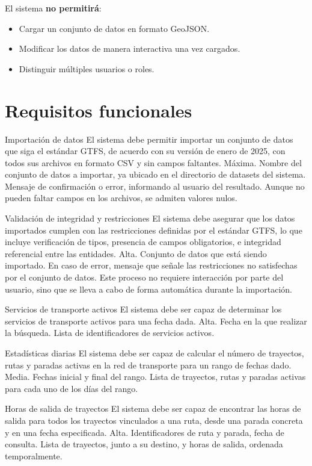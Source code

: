 El sistema \textbf{no permitirá}:
\begin{itemize}
    \item Cargar un conjunto de datos en formato GeoJSON.
    \item Modificar los datos de manera interactiva una vez cargados.
    \item Distinguir múltiples usuarios o roles.
\end{itemize}


\section{Requisitos funcionales}

\freq
    {Importación de datos}
    {El sistema debe permitir importar un conjunto de datos que siga el estándar GTFS, de acuerdo con su versión de enero de 2025, con todos sus archivos en formato CSV y sin campos faltantes.}
    {Máxima.}
    {Nombre del conjunto de datos a importar, ya ubicado en el directorio de datasets del sistema.}
    {Mensaje de confirmación o error, informando al usuario del resultado.}
    {Aunque no pueden faltar campos en los archivos, se admiten valores nulos.}

\freq
    {Validación de integridad y restricciones}
    {El sistema debe asegurar que los datos importados cumplen con las restricciones definidas por el estándar GTFS, lo que incluye verificación de tipos, presencia de campos obligatorios, e integridad referencial entre las entidades.}
    {Alta.}
    {Conjunto de datos que está siendo importado.}
    {En caso de error, mensaje que señale las restricciones no satisfechas por el conjunto de datos.}
    {Este proceso no requiere interacción por parte del usuario, sino que se lleva a cabo de forma automática durante la importación.}
    
\freq
    {Servicios de transporte activos}
    {El sistema debe ser capaz de determinar los servicios de transporte activos para una fecha dada.}
    {Alta.}
    {Fecha en la que realizar la búsqueda.}
    {Lista de identificadores de servicios activos.}
    {}

\freq
    {Estadísticas diarias}
    {El sistema debe ser capaz de calcular el número de trayectos, rutas y paradas activas en la red de transporte para un rango de fechas dado.}
    {Media.}
    {Fechas inicial y final del rango.}
    {Lista de trayectos, rutas y paradas activas para cada uno de los días del rango.}
    {}

\freq
    {Horas de salida de trayectos}
    {El sistema debe ser capaz de encontrar las horas de salida para todos los trayectos vinculados a una ruta, desde una parada concreta y en una fecha especificada.}
    {Alta.}
    {Identificadores de ruta y parada, fecha de consulta.}
    {Lista de trayectos, junto a su destino, y horas de salida, ordenada temporalmente.}
    {}

